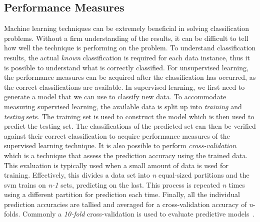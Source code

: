 \subsection{Performance Measures}
\label{subsec:background_performance_measures}
Machine learning techniques can be extremely beneficial in solving classification problems. Without a firm understanding of the results, it can be difficult to tell how well the technique is performing on the problem. To understand classification results, the actual \emph{known} classification is required for each data instance, thus it is possible to understand what is correctly classified. For unsupervised learning, the performance measures can be acquired after the classification has occurred, as the correct classifications are available. In supervised learning, we first need to generate a model that we can use to classify new data. To accommodate measuring supervised learning, the available data is split up into \emph{training} and \emph{testing} sets. The training set is used to construct the model which is then used to predict the testing set. The classifications of the predicted set can then be verified against their correct classification to acquire performance measures of the supervised learning technique. It is also possible to perform \emph{cross-validation} which is a technique that assess the prediction accuracy using the trained data. This evaluation is typically used when a small amount of data is used for training. Effectively, this divides a data set into \emph{n} equal-sized partitions and the \gls{svm} trains on \emph{n-1} sets, predicting on the last. This process is repeated \emph{n} times using a different partition for prediction each time. Finally, all the individual prediction accuracies are tallied and averaged for a cross-validation accuracy of \emph{n}-folds. Commonly a \emph{10-fold} cross-validation is used to evaluate predictive models~\cite{Koh95}.

